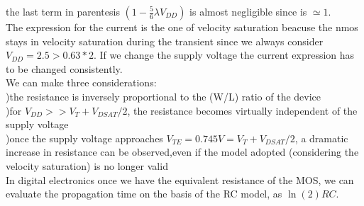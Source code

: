 the last term in parentesis $\left(1-\frac{5}{6}\lambda V_{DD} \right)$ is almost negligible since is $\simeq 1$.\\
The expression for the current is the one of velocity saturation beacuse the nmos stays in velocity saturation during the transient since we always consider $V_{DD}=2.5>0.63*2$. If we change the supply voltage the current expression has to be changed consistently.\\
We can make three considerations:\\
)the resistance is inversely proportional to the (W/L) ratio of the device\\
)for $V_{DD} >> V_T + V_{DSAT}/2$, the resistance becomes virtually independent of the supply voltage\\
)once the supply voltage approaches $V_{TE} =0.745V=V_T+V_{DSAT}/2$, a dramatic increase in resistance can be observed,even if the model adopted (considering the velocity saturation) is no longer valid\\
\vspace{5mm}
In digital electronics once we have the equivalent resistance of the MOS, we can evaluate the propagation time on the basis of the RC model, as $\ln(2)RC$.\\














